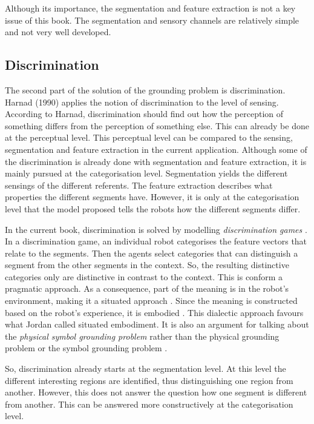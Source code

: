 Although its importance, the segmentation and feature extraction is not a key issue of this book. The segmentation and sensory channels are relatively simple and not very well developed. 

\subsection{Discrimination}

The second part of the solution of the grounding problem is discrimination. Harnad (1990) applies the notion of discrimination to the level of sensing. According to Harnad, discrimination should find out how the perception of something differs from the perception of something else. This can already be done at the perceptual level. This perceptual level can be compared to the sensing, segmentation and feature extraction in the current application. Although some of the discrimination is already done with segmentation and feature extraction, it is mainly pursued at the categorisation level. Segmentation yields the different sensings of the different referents. The feature extraction describes what properties the different segments have. However, it is only at the categorisation level that the model proposed tells the robots how the different segments differ.

In the current book, discrimination is solved by modelling {\em discrimination games} \citep{steels:1996b}. In a discrimination game, an individual robot categorises the feature vectors that relate to the segments. Then the agents select categories that can distinguish a segment from the other segments in the context. So, the resulting distinctive categories only are distinctive in contrast to the context. This is conform a pragmatic approach. As a consequence, part of the meaning is in the robot's environment, making it a situated approach \citep{clancey:1997}. Since the meaning is constructed based on the robot's experience, it is embodied \citep{lakoff:1987}. This dialectic approach favours what Jordan \citet{zlatev:1997} called situated embodiment. It is also an argument for talking about the {\em physical symbol grounding problem} rather than the physical grounding problem \citep{brooks:1990} or the symbol grounding problem \citep{harnad:1990}.


So, discrimination already starts at the segmentation level. At this level the different interesting regions are identified, thus distinguishing one region from another. However, this does not answer the question how one segment is different from another. This can be answered more constructively at the categorisation level.

